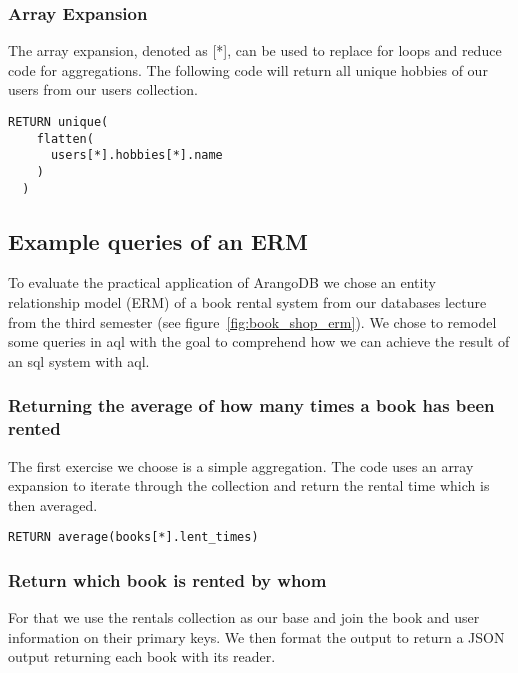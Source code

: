 \subsubsection{Array Expansion}

The array expansion, denoted as [*], can be used to replace for loops and reduce code for aggregations. The following code will return all unique hobbies of our users from our users collection.

\begin{lstlisting}[language=ArangoQL,label={lst:graph},caption={Array Expansion}]
  RETURN unique(
    flatten(
      users[*].hobbies[*].name
    )
  )
\end{lstlisting}

\subsection{Example queries of an ERM}

To evaluate the practical application of ArangoDB we chose an entity relationship model (ERM) of a book rental system from our databases lecture from the third semester (see figure~\ref{fig:book_shop_erm}). We chose to remodel some queries in \gls{aql} with the goal to comprehend how we can achieve the result of an \gls{sql} system with \gls{aql}.

\subsubsection{Returning the average of how many times a book has been rented}

The first exercise we choose is a simple aggregation. The code uses an array expansion to iterate through the collection and return the rental time which is then averaged.

\begin{lstlisting}[language=ArangoQL,label={lst:graph},caption={Returning the average of how many times a book has been rented}]
  RETURN average(books[*].lent_times)
\end{lstlisting}

\subsubsection{Return which book is rented by whom}

For that we use the rentals collection as our base and join the book and user information on their primary keys. We then format the output to return a JSON output returning each book with its reader.

